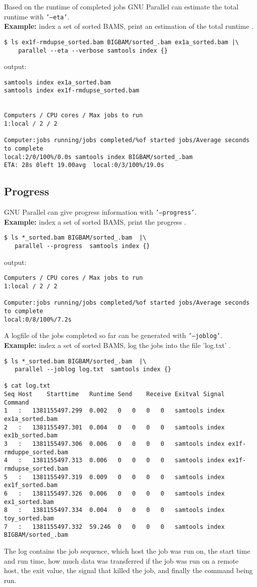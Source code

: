 \documentclass{article}
\newcommand{\example}[1]{
\textbf{Example: } {\color[rgb]{0,0,1} #1 } .
}
\newcommand{\cmdoption}[1]{\texttt{'#1'}}
\begin{document}
Based on the runtime of completed jobs GNU Parallel can estimate the total runtime with \cmdoption{--eta}.\\
\example{index a set of sorted BAMS, print an estimation of the total runtime}
\begin{lstlisting}
$ ls ex1f-rmdupse_sorted.bam BIGBAM/sorted_.bam ex1a_sorted.bam |\
	parallel --eta --verbose samtools index {} 
\end{lstlisting}
output:
\begin{lstlisting}
samtools index ex1a_sorted.bam
samtools index ex1f-rmdupse_sorted.bam


Computers / CPU cores / Max jobs to run
1:local / 2 / 2

Computer:jobs running/jobs completed/%of started jobs/Average seconds to complete
local:2/0/100%/0.0s samtools index BIGBAM/sorted_.bam
ETA: 28s 0left 19.00avg  local:0/3/100%/19.0s 
\end{lstlisting}


\subsection{Progress}
GNU Parallel can give progress information with \cmdoption{--progress}.\\
\example{index a set of sorted BAMS, print the progress}
\begin{lstlisting}
$ ls *_sorted.bam BIGBAM/sorted_.bam  |\
   parallel --progress  samtools index {}
\end{lstlisting}
output:
\begin{lstlisting}
Computers / CPU cores / Max jobs to run
1:local / 2 / 2

Computer:jobs running/jobs completed/%of started jobs/Average seconds to complete
local:0/8/100%/7.2s 
\end{lstlisting}

A logfile of the jobs completed so far can be generated with \cmdoption{--joblog}.\\
\example{index a set of sorted BAMS, log the jobs into the file 'log.txt'}
\begin{lstlisting}
$ ls *_sorted.bam BIGBAM/sorted_.bam  |\
   parallel --joblog log.txt  samtools index {}

$ cat log.txt
Seq	Host	Starttime	Runtime	Send	Receive	Exitval	Signal	Command
1	:	1381155497.299	0.002	0	0	0	0	samtools index ex1a_sorted.bam
2	:	1381155497.301	0.004	0	0	0	0	samtools index ex1b_sorted.bam
3	:	1381155497.306	0.006	0	0	0	0	samtools index ex1f-rmduppe_sorted.bam
4	:	1381155497.313	0.006	0	0	0	0	samtools index ex1f-rmdupse_sorted.bam
5	:	1381155497.319	0.009	0	0	0	0	samtools index ex1f_sorted.bam
6	:	1381155497.326	0.006	0	0	0	0	samtools index ex1_sorted.bam
8	:	1381155497.334	0.004	0	0	0	0	samtools index toy_sorted.bam
7	:	1381155497.332	59.246	0	0	0	0	samtools index BIGBAM/sorted_.bam
\end{lstlisting}
The log contains the job sequence, which host the job was run on, the start time and run time, how much data was transferred if the job was run on a remote host, the exit value, the signal that killed the job, and finally the command being run.\\
\end{document}
